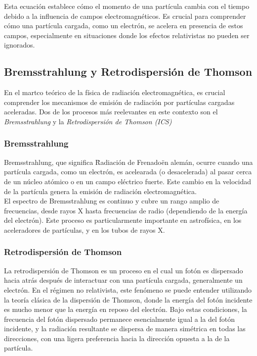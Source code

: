 Esta ecuación establece cómo el momento de una partícula cambia con el tiempo debido a la influencia de campos electromagnéticos. Es crucial para comprender cómo una partícula cargada, como un electrón, se acelera en presencia de estos campos, especialmente en situaciones donde los efectos relativistas no pueden ser ignorados.


\subsection{Bremsstrahlung y Retrodispersión de Thomson}
En el martco teórico de la física de radiación electromagnética, es crucial comprender los mecanismos de emisión de radiación por partículas cargadas aceleradas. Dos de los procesos más reelevantes en este contexto son el \textit{Bremsstrahlung} y la \textit{Retrodispersión de Thomson (ICS)}

\subsubsection{Bremsstrahlung}
Bremsstrahlung, que significa \" Radiación de Frenado\" en alemán, ocurre cuando una partícula cargada, como un electrón, es acelearada (o desacelerada) al pasar cerca de un núcleo atómico o en un campo eléctrico fuerte. Este cambio en la velocidad de la partícula genera la emisión de radiación electromagnética. \\

El espectro de Bremsstrahlung es continuo y cubre un rango amplio de frecuencias, desde rayos X hasta frecuencias de radio (dependiendo de la energía del electrón). Este proceso es particularmente importante en astrofísica, en los aceleradores de partículas, y en los tubos de rayos X.



\subsubsection{Retrodispersión de Thomson}
La retrodispersión de Thomson es un proceso en el cual un fotón es dispersado hacia atrás después de interactuar con una partícula cargada, generalmente un electrón. En el régimen no relativista, este fenómeno se puede entender utilizando la teoría clásica de la dispersión de Thomson, donde la energía del fotón incidente es mucho menor que la energía en reposo del electrón. Bajo estas condiciones, la frecuencia del fotón dispersado permanece esencialmente igual a la del fotón incidente, y la radiación resultante se dispersa de manera simétrica en todas las direcciones, con una ligera preferencia hacia la dirección opuesta a la de la partícula.

